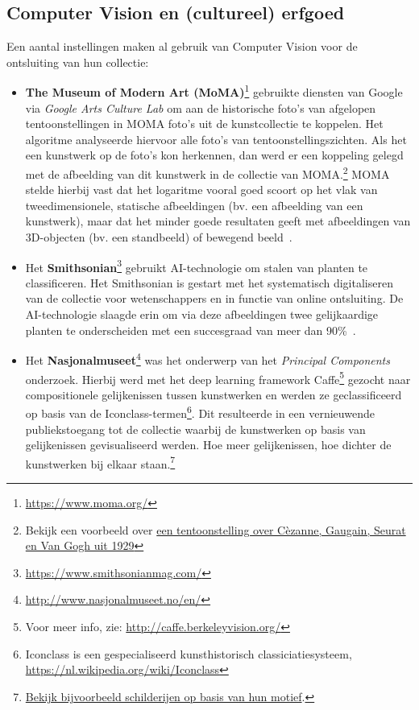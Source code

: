 \subsection{Computer Vision en (cultureel) erfgoed}
Een aantal instellingen maken al gebruik van Computer Vision voor de ontsluiting van hun collectie:
\begin{itemize}
	\item \textbf{The Museum of Modern Art (MoMA)}\footnote{\url{https://www.moma.org/}} gebruikte diensten van Google via \emph{Google Arts Culture Lab} om aan de historische foto's van afgelopen tentoonstellingen in MOMA foto's uit de kunstcollectie te koppelen. Het algoritme analyseerde hiervoor alle foto's van tentoonstellingszichten. Als het een kunstwerk op de foto's kon herkennen, dan werd er een koppeling gelegd met de afbeelding van dit kunstwerk in de collectie van MOMA.\footnote{Bekijk een voorbeeld over \href{https://www.moma.org/calendar/exhibitions/1767/installation_images/10473}{een tentoonstelling over C\`{e}zanne, Gaugain, Seurat en Van Gogh uit 1929}} MOMA stelde hierbij vast dat het logaritme vooral goed scoort op het vlak van tweedimensionele, statische afbeeldingen (bv. een afbeelding van een kunstwerk), maar dat het minder goede resultaten geeft met afbeeldingen van 3D-objecten (bv. een standbeeld) of bewegend beeld~\autocite{MOMA2018?}.

	\item Het \textbf{Smithsonian}\footnote{\url{https://www.smithsonianmag.com/}} gebruikt AI-technologie om stalen van planten te classificeren. Het Smithsonian is gestart met het systematisch digitaliseren van de collectie voor wetenschappers en in functie van online ontsluiting. De AI-technologie slaagde erin om via deze afbeeldingen twee gelijkaardige planten te onderscheiden met een succesgraad van meer dan 90\%~\autocite{Smith2017}.

	\item Het \textbf{Nasjonalmuseet}\footnote{\url{http://www.nasjonalmuseet.no/en/}} was het onderwerp van het \emph{Principal Components} onderzoek. Hierbij werd met het deep learning framework Caffe\footnote{Voor meer info, zie: \url{http://caffe.berkeleyvision.org/}} gezocht naar compositionele gelijkenissen tussen kunstwerken en werden ze geclassificeerd op basis van de Iconclass-termen\footnote{Iconclass is een gespecialiseerd kunsthistorisch classiciatiesysteem, \url{https://nl.wikipedia.org/wiki/Iconclass}}. Dit resulteerde in een vernieuwende publiekstoegang tot de collectie waarbij de kunstwerken op basis van gelijkenissen gevisualiseerd werden. Hoe meer gelijkenissen, hoe dichter de kunstwerken bij elkaar staan.\footnote{\href{http://vy.nasjonalmuseet.no/?collection=painting_subject}{Bekijk bijvoorbeeld schilderijen op basis van hun motief}.} \autocites{Nasjonalmuseet2017?}{Westvang2017?}
\end{itemize}

